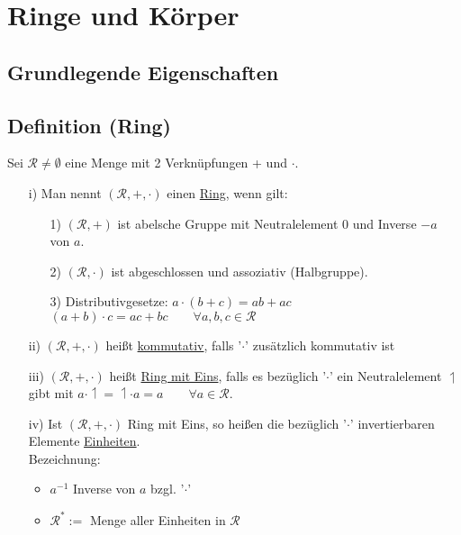 \documentclass[a4paper, 12pt,titlepage, pdf, headsepline]{scrartcl}
\newcommand{\uline}[1]{\underline{#1}}
\renewcommand{\>}{\rightarrow}
\renewcommand{\*}{\cdot}
\begin{document}
	      \section{Ringe und Körper}
	      \subsection*{Grundlegende Eigenschaften}
	      \subsection{Definition (Ring)}
	      Sei $\mathcal{R} \neq \emptyset$ eine Menge mit 2 Verknüpfungen + und $\cdot$.
	      \begin{itemize}
	      	\item[i)] Man nennt $(\mathcal{R}, + , \cdot)$ einen \uline{Ring}, wenn gilt: 
	      	      \begin{itemize}
	      	      	\item[1)] $(\mathcal{R}, + )$ ist abelsche Gruppe mit Neutralelement 0 und Inverse $-a$ von $a$.
	      	      	\item[2)] $(\mathcal{R}, \cdot)$ ist abgeschlossen und assoziativ (Halbgruppe).
	      	      	\item[3)] Distributivgesetze: $a \cdot (b+c) = ab + ac$\\
	      	      	      \noindent\hspace*{32.5mm}$ (a+b) \cdot c = ac + bc \qquad \forall a,b,c \in \mathcal{R}$
	      	      \end{itemize}
	      	\item[ii)] $(\mathcal{R},+,\cdot)$ heißt \uline{kommutativ}, falls '$\cdot$' zusätzlich kommutativ ist
	      	\item[iii)] $(\mathcal{R},+,\cdot)$ heißt \uline{Ring mit Eins}, falls es bezüglich '$\cdot$' ein Neutralelement $\upharpoonleft$ gibt mit $a \cdot \upharpoonleft = \upharpoonleft \cdot a = a \qquad \forall a \in \mathcal{R}$.
	      	\item[iv)] Ist $(\mathcal{R},+,\cdot)$ Ring mit Eins, so heißen die bezüglich '$\cdot$' invertierbaren Elemente \uline{Einheiten}. \\
	      	      Bezeichnung: 
	      	      \begin{itemize}
	      	      	\item $a^{-1}$ Inverse von $a$ bzgl. '$\cdot$' \item $\mathcal{R}^* :=$ Menge aller Einheiten in $\mathcal{R}$
	      	      \end{itemize}
	      \end{itemize}
\end{document}
